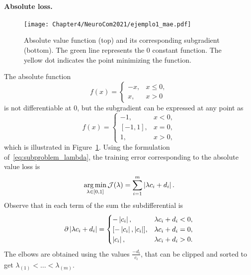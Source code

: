 \paragraph*{Absolute loss.\\}
\begin{figure}[t!]
    \centering
    \texttt{[image: Chapter4/NeuroCom2021/ejemplo1\_mae.pdf]}
    \caption{Absolute value function (top) and its corresponding subgradient (bottom). The green line represents the $0$ constant function. The yellow dot indicates the point minimizing the function.}
    \label{fig:abs_loss}
\end{figure}
The absolute function 
\begin{equation}
    \nonumber
    f(x) = 
    \begin{cases}
    -x ,& x \leq 0, \\
    x ,& x > 0    
    \end{cases}
\end{equation}
is not differentiable at $0$, but the subgradient can be expressed at any point as
\begin{equation}
    \nonumber
    f(x) = 
    \begin{cases}
    -1 ,& x < 0, \\
    [-1, 1] ,& x = 0 , \\
    1 ,& x > 0 ,
    \end{cases}
\end{equation}
which is illustrated in Figure~\ref{fig:abs_loss}.
Using the formulation of~\eqref{eq:subproblem_lambda}, the training error corresponding to the absolute value loss is
\begin{equation}
    \label{eq:opt_abs}
    \argmin_{\lambda \in [0, 1]} \mathcal{J}(\lambda) = \sum_{i=1}^{\npertask} \abs{\lambda c_i + d_i}.
\end{equation}
Observe that in each term of the sum the subdifferential is 
\begin{align*}
    \partial \abs{\lambda c_i + d_i} = 
    \begin{cases}
        -\abs{c_i} ,& \lambda c_i + d_i  < 0, \\
        [-\abs{c_i}, \abs{c_i}] ,& \lambda c_i + d_i  = 0, \\
        \abs{c_i} ,& \lambda c_i + d_i  > 0 .\\
    \end{cases} 
\end{align*}
The elbows are obtained using the values $\frac{-d_i}{c_i}$, that can be clipped and sorted to get ${\lambda}_{(1)} < \ldots < {\lambda}_{(m)}$.
